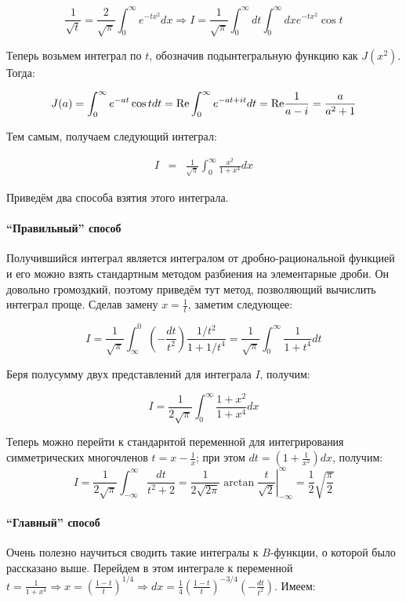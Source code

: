 \documentclass[a4paper,12pt]{article}
\begin{document}
\[
\frac{1}{\sqrt{t}}=\frac{2}{\sqrt{\pi}}\int_{0}^{\infty}e^{-tx^{2}}dx\Rightarrow I=\frac{1}{\sqrt{\pi}}\int_{0}^{\infty}dt\int_{0}^{\infty}dxe^{-tx^{2}}\cos t
\]

\noindent
Теперь возьмем интеграл по $t$, обозначив подынтегральную функцию
как $J(x^{2})$. Тогда:

\[
J(a)=\int_{0}^{\infty}e^{-at}\cos tdt={\rm Re}\int_{0}^{\infty}e^{-at+it}dt={\rm Re}\frac{1}{a-i}=\frac{a}{a^{2}+1}
\]

\noindent
Тем самым, получаем следующий интеграл:

\begin{eqnarray*}
I & = & \frac{1}{\sqrt{\pi}}\int_{0}^{\infty}\frac{x^{2}}{1+x^{4}}dx
\end{eqnarray*}

\noindent
Приведём два способа взятия этого интеграла.


\paragraph{``Правильный'' способ}

Получившийся интеграл является интегралом от дробно-рациональной функцией
и его можно взять стандартным методом разбиения на элементарные дроби.
Он довольно громоздкий, поэтому приведём тут метод, позволяющий вычислить
интеграл проще. Сделав замену $x=\frac{1}{t}$, заметим следующее:

\[
I=\frac{1}{\sqrt{\pi}}\int_{\infty}^{0}\left(-\frac{dt}{t^{2}}\right)\frac{1/t^{2}}{1+1/t^{4}}=\frac{1}{\sqrt{\pi}}\int_{0}^{\infty}\frac{1}{1+t^{4}}dt
\]

\noindent
Беря полусумму двух представлений для интеграла $I$, получим:

\[
I=\frac{1}{2\sqrt{\pi}}\int_{0}^{\infty}\frac{1+x^{2}}{1+x^{4}}dx
\]

\noindent
Теперь можно перейти к стандарнтой переменной для интегрирования симметрических
многочленов $t=x-\frac{1}{x}$; при этом $dt=\left(1+\frac{1}{x^{2}}\right)dx$,
получим:
\[
I=\frac{1}{2\sqrt{\pi}}\int_{-\infty}^{\infty}\frac{dt}{t^{2}+2}=\frac{1}{2\sqrt{2\pi}}\left.\arctan\frac{t}{\sqrt{2}}\right|_{-\infty}^{\infty}=\frac{1}{2}\sqrt{\frac{\pi}{2}}
\]



\paragraph{``Главный'' способ}

Очень полезно научиться сводить такие интегралы к $B$-функции, о
которой было рассказано выше. Перейдем в этом интеграле к переменной
$t=\frac{1}{1+x^{4}}\Rightarrow x=\left(\frac{1-t}{t}\right)^{1/4}\Rightarrow dx=\frac{1}{4}\left(\frac{1-t}{t}\right)^{-3/4}\left(-\frac{dt}{t^{2}}\right)$.
Имеем:
\end{document}
